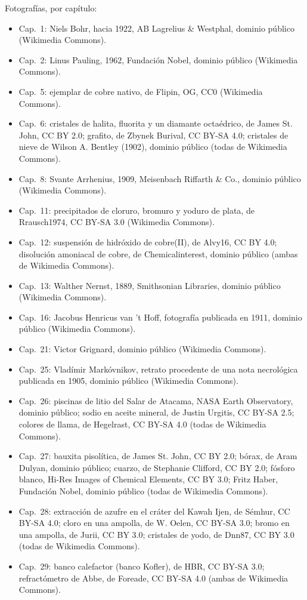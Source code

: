 \bigskip
\noindent Fotografías, por capítulo:
\begin{itemize}\small
  \item Cap.~1: Niels Bohr, hacia 1922, AB Lagrelius \& Westphal, dominio
        público (Wikimedia Commons).
  \item Cap.~2: Linus Pauling, 1962, Fundación Nobel, dominio público
        (Wikimedia Commons).
  \item Cap.~5: ejemplar de cobre nativo, de Flipin, OG, CC0 (Wikimedia
        Commons).
  \item Cap.~6: cristales de halita, fluorita y un diamante octaédrico, de
        James St. John, CC BY 2.0; grafito, de Zbynek Burival,
        CC BY-SA 4.0; cristales de nieve de Wilson A. Bentley (1902),
        dominio público (todas de Wikimedia Commons).
  \item Cap.~8: Svante Arrhenius, 1909, Meisenbach Riffarth \& Co.,
        dominio público (Wikimedia Commons).
  \item Cap.~11: precipitados de cloruro, bromuro y yoduro de plata, de
        Rrausch1974, CC BY-SA 3.0 (Wikimedia Commons).
  \item Cap.~12: suspensión de hidróxido de cobre(II), de Alvy16,
        CC BY 4.0; disolución amoniacal de cobre, de Chemicalinterest,
        dominio público (ambas de Wikimedia Commons).
  \item Cap.~13: Walther Nernst, 1889, Smithsonian Libraries, dominio
        público (Wikimedia Commons).
  \item Cap.~16: Jacobus Henricus van 't Hoff, fotografía publicada en
        1911, dominio público (Wikimedia Commons).
  \item Cap.~21: Victor Grignard, dominio público (Wikimedia Commons).
  \item Cap.~25: Vladímir Markóvnikov, retrato procedente de una nota
        necrológica publicada en 1905, dominio público (Wikimedia
        Commons).
  \item Cap.~26: piscinas de litio del Salar de Atacama, NASA Earth
        Observatory, dominio público; sodio en aceite mineral, de Justin
        Urgitis, CC BY-SA 2.5; colores de llama, de Hegelrast,
        CC BY-SA 4.0 (todas de Wikimedia Commons).
  \item Cap.~27: bauxita pisolítica, de James St. John, CC BY 2.0;
        bórax, de Aram Dulyan, dominio público; cuarzo, de Stephanie
        Clifford, CC BY 2.0; fósforo blanco, Hi-Res Images of Chemical
        Elements, CC BY 3.0; Fritz Haber, Fundación Nobel, dominio público
        (todas de Wikimedia Commons).
  \item Cap.~28: extracción de azufre en el cráter del Kawah Ijen, de
        S\'emhur, CC BY-SA 4.0; cloro en una ampolla, de W. Oelen,
        CC BY-SA 3.0; bromo en una ampolla, de Jurii, CC BY 3.0; cristales
        de yodo, de Dnn87, CC BY 3.0 (todas de Wikimedia Commons).
  \item Cap.~29: banco calefactor (banco Kofler), de HBR, CC BY-SA 3.0;
        refractómetro de Abbe, de Foreade, CC BY-SA 4.0 (ambas de
        Wikimedia Commons).
\end{itemize}
\clearpage
